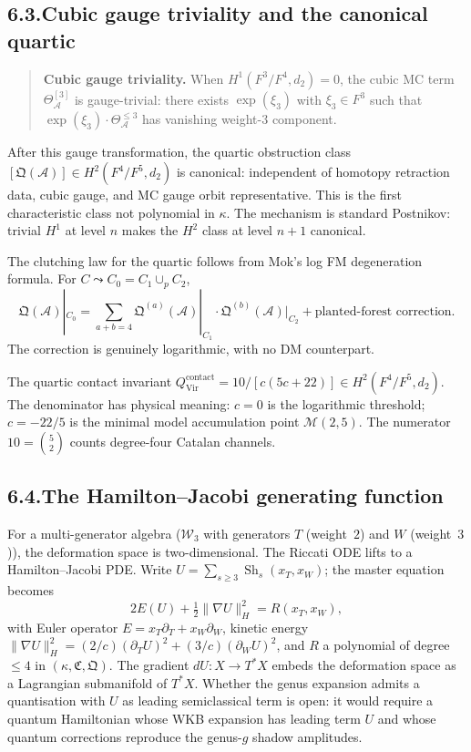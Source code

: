 \documentclass[11pt,reqno]{amsart}
\theoremstyle{definition}
\theoremstyle{remark}
\providecommand{\cA}{\mathcal{A}}
\numberwithin{equation}{section}
\begin{document}
\subsection*{6.3.\enspace Cubic gauge triviality and the canonical quartic}

\begin{quote}
\textbf{Cubic gauge triviality.}\enspace
When $H^1(F^3/F^4,d_2)=0$, the cubic MC term $\Theta^{[3]}_\cA$ is
gauge-trivial: there exists $\exp(\xi_3)$ with $\xi_3\in F^3$ such that
$\exp(\xi_3)\cdot\Theta^{\le 3}_\cA$ has vanishing weight-$3$
component.
\end{quote}

After this gauge transformation, the quartic obstruction class
$[\mathfrak Q(\cA)]\in H^2(F^4/F^5,d_2)$ is canonical: independent of
homotopy retraction data, cubic gauge, and MC gauge orbit
representative. This is the first characteristic class not polynomial
in $\kappa$. The mechanism is standard Postnikov: trivial $H^1$ at
level $n$ makes the $H^2$ class at level $n+1$ canonical.

The clutching law for the quartic follows from Mok's log FM
degeneration formula. For $C\leadsto C_0=C_1\cup_p C_2$,
\[
\mathfrak Q(\cA)|_{C_0}=\sum_{a+b=4}\mathfrak Q^{(a)}(\cA)|_{C_1}\cdot\mathfrak Q^{(b)}(\cA)|_{C_2}+\text{planted-forest correction}.
\]
The correction is genuinely logarithmic, with no DM counterpart.

The quartic contact invariant
$Q^{\mathrm{contact}}_{\mathrm{Vir}}=10/[c(5c+22)]\in H^2(F^4/F^5,d_2)$.
The denominator has physical meaning: $c=0$ is the logarithmic
threshold; $c=-22/5$ is the minimal model accumulation point
$\mathcal M(2,5)$. The numerator $10=\binom{5}{2}$ counts degree-four
Catalan channels.

\subsection*{6.4.\enspace The Hamilton--Jacobi generating function}

For a multi-generator algebra ($\mathcal W_3$ with generators $T$
(weight~$2$) and $W$ (weight~$3$)), the deformation space is
two-dimensional. The Riccati ODE lifts to a Hamilton--Jacobi PDE.
Write $U=\sum_{s\ge 3}\operatorname{Sh}_s(x_T,x_W)$; the master equation
becomes
\[
2E(U)+\tfrac12\lVert\nabla U\rVert^2_H=R(x_T,x_W),
\]
with Euler operator $E=x_T\partial_T+x_W\partial_W$, kinetic energy
$\lVert\nabla U\rVert^2_H=(2/c)(\partial_T U)^2+(3/c)(\partial_W U)^2$,
and $R$ a polynomial of degree $\le 4$ in
$(\kappa,\mathfrak C,\mathfrak Q)$. The gradient $dU\colon X\to T^*X$
embeds the deformation space as a Lagrangian submanifold of $T^*X$.
Whether the genus expansion admits a quantisation with $U$ as leading
semiclassical term is open: it would require a quantum Hamiltonian
whose WKB expansion has leading term $U$ and whose quantum corrections
reproduce the genus-$g$ shadow amplitudes.
\end{document}
